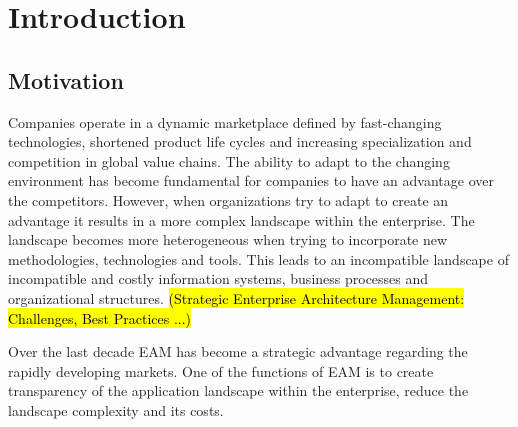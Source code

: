 


\chapter{Introduction}\label{chapter:introduction}


\section{Motivation}
Companies operate in a dynamic marketplace defined by fast-changing technologies, shortened product life cycles and increasing specialization and competition in global value chains. The ability to adapt to the changing environment has become fundamental for companies to have an advantage over the competitors. 
However, when organizations try to adapt to create an advantage it results in a more complex landscape within the enterprise. The landscape becomes more heterogeneous when trying to incorporate new methodologies, technologies and tools. This leads to an incompatible landscape of incompatible and costly information systems, business processes and organizational structures. \hl{(Strategic Enterprise Architecture Management: Challenges, Best Practices ...)}

Over the last decade EAM has become a strategic advantage regarding the rapidly developing markets. One of the functions of EAM is to create transparency of the application landscape within the enterprise, reduce the landscape complexity and its costs.

